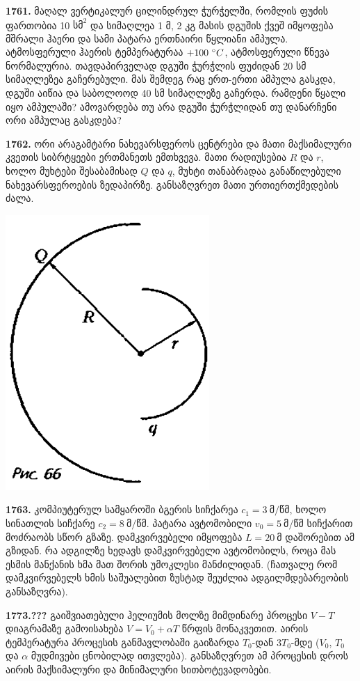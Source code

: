 \documentclass[12pt,a4paper,]{report}
\begin{document}
\textbf{1761.} მაღალ ვერტიკალურ ცილინდრულ ჭურჭელში, რომლის ფუძის ფართობია 10 $\text{სმ}^2$ და სიმაღლეა 1 მ, 2 კგ მასის დგუშის ქვეშ იმყოფება მშრალი ჰაერი და სამი პატარა ერთნაირი წყლიანი ამპულა. ატმოსფერული ჰაერის ტემპერატურაა $+100\ \degree C$, ატმოსფერული წნევა ნორმალურია. თავდაპირველად დგუში ჭურჭლის ფუძიდან 20 სმ სიმაღლეზეა გაჩერებული. მას შემდეგ რაც ერთ-ერთი ამპულა გასკდა, დგუში აიწია და საბოლოოდ 40 სმ სიმაღლეზე გაჩერდა. რამდენი წყალი იყო ამპულაში? ამოვარდება თუ არა დგუში ჭურჭლიდან თუ დანარჩენი ორი ამპულაც გასკდება?

\textbf{1762.} ორი არაგამტარი ნახევარსფეროს ცენტრები და მათი მაქსიმალური კვეთის სიბრტყეები ერთმანეთს ემთხვევა. მათი რადიუსებია $R$ და $r$, ხოლო მუხტები შესაბამისად $Q$ და $q$, მუხტი თანაბრადაა განაწილებული ნახევარსფეროების ზედაპირზე. განსაზღვრეთ მათი ურთიერთქმედების ძალა.
		\begin{center}
			\includegraphics[scale=0.4]{images/F1762.png}
		\end{center}
	
\textbf{1763.} კომპიუტერულ სამყაროში ბგერის სიჩქარეა $c_1=3 \ \text{მ/წმ}$, ხოლო სინათლის სიჩქარე $c_2=8 \ \text{მ/წმ}$. პატარა ავტომობილი $v_0=5 \ \text{მ/წმ}$ სიჩქარით მოძრაობს სწორ გზაზე. დამკვირვებელი იმყოფება $L=20 \ \text{მ}$ დაშორებით ამ გზიდან. რა ადგილზე ხედავს დამკვირვებელი ავტომობილს, როცა მას ესმის მანქანის ხმა მათ შორის უმოკლესი მანძილიდან. (ჩათვალე რომ დამკვირვებელს ხმის საშუალებით ზუსტად შეუძლია ადგილმდებარეობის განსაზღვრა).

\textbf{1773.???} გაიშვიათებული ჰელიუმის მოლზე მიმდინარე პროცესი  $V-T$ დიაგრამაზე გამოისახება $V=V_0+\alpha T$ წრფის მონაკვეთით. აირის ტემპერატურა პროცესის განმავლობაში გაიზარდა $T_0$-დან $3T_0$-მდე  ($V_0$, $T_0$ და $\alpha$ მუდმივები ცნობილად ითვლება). განსაზღვრეთ ამ პროცესის დროს აირის მაქსიმალური და მინიმალური სითბოტევადობები.
\end{document}
